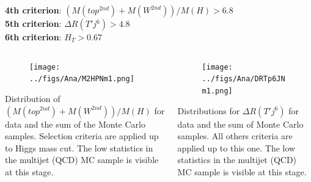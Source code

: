 \begin{frame}{}
\vspace{-.2cm}
    \begin{block}{}\scriptsize
      \textbf{4th criterion}: $(M(top^{2nd})+M(W^{2nd}))/M(H)>6.8$\\
      \textbf{5th criterion}: $\Delta R (T' j^{6})>4.8$\\
      \textbf{6th criterion}: $H_{T}>0.67$
    \end{block}

\vspace{-.5cm}
\begin{columns}
\begin{column}{.50\textwidth}
\begin{figure}[!Hhtbp]
  \begin{center}
    \texttt{[image: ../figs/Ana/M2HPNm1.png]}
  \end{center}
\end{figure}

\vspace{-.7cm}
    \begin{block}{}\tiny
      Distribution of $(M(top^{2nd})+M(W^{2nd}))/M(H)$ for data and the sum of the Monte Carlo samples. Selection criteria are applied up to Higgs mass cut. The low statistics in the multijet (QCD) MC sample is visible at this stage.
    \end{block}
\end{column}

\begin{column}{.50\textwidth}
\begin{figure}[!Hhtbp]
  \begin{center}
    \texttt{[image: ../figs/Ana/DRTp6JNm1.png]}
  \end{center}
\end{figure}

\vspace{-.7cm}
    \begin{block}{}\tiny
      Distributions for $\Delta R (T' j^{6})$  for data and the sum of Monte Carlo samples. All others criteria are applied up to this one. The low statistics in the multijet (QCD) MC sample is visible at this stage.
    \end{block}
\end{column}

\end{columns}

\end{frame}

